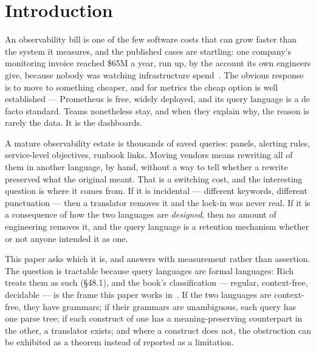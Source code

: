 
\section{Introduction}
\label{sec:intro}

An observability bill is one of the few software costs that can grow faster than the
system it measures, and the published cases are startling: one company's monitoring
invoice reached \$65M a year, run up, by the account its own engineers give, because
nobody was watching infrastructure spend~\citep{orosz2023}. The obvious response is to move to something cheaper, and for
metrics the cheap option is well established --- Prometheus is free, widely deployed, and
its query language is a de facto standard. Teams nonetheless stay, and when they explain
why, the reason is rarely the data. It is the dashboards.

A mature observability estate is thousands of saved queries: panels, alerting rules,
service-level objectives, runbook links. Moving vendors means rewriting all of them in
another language, by hand, without a way to tell whether a rewrite preserved what the
original meant. That is a switching cost, and the interesting question is where it comes
from. If it is incidental --- different keywords, different punctuation --- then a
translator removes it and the lock-in was never real. If it is a consequence of how the
two languages are \emph{designed}, then no amount of engineering removes it, and the
query language is a retention mechanism whether or not anyone intended it as one.

This paper asks which it is, and answers with measurement rather than assertion. The
question is tractable because query languages are formal languages: Rich treats them as
such (§48.1), and the book's classification --- regular, context-free, decidable --- is
the frame this paper works in~\citep{rich2008}. If the two languages are context-free,
they have grammars; if their grammars are unambiguous, each query has one parse tree; if
each construct of one has a meaning-preserving counterpart in the other, a translator
exists; and where a construct does not, the obstruction can be exhibited as a theorem
instead of reported as a limitation.

